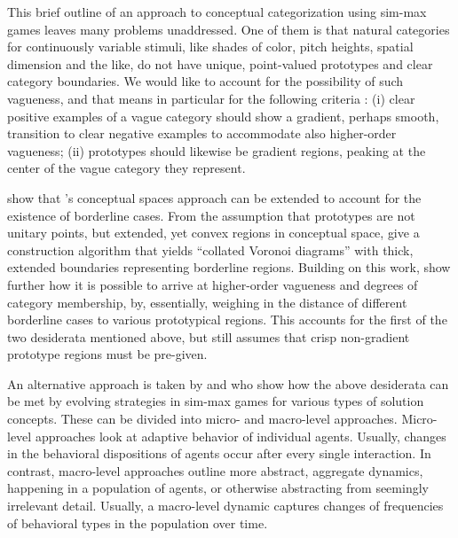 This brief outline of an approach to conceptual categorization using
sim-max games leaves many problems unaddressed. One of them is that
natural categories for continuously variable stimuli, like shades of
color, pitch heights, spatial dimension and the like, do not have
unique, point-valued prototypes and clear category boundaries. We
would like to account for the possibility of such vagueness, and that
means in particular for the following criteria
\citep[e.g.][]{Sainsbury1991:Is-There-Higher,KeefeSmith1997:Vagueness:-A-Re,Smith2008:Vagueness-and-D}:
(i) clear positive examples of a vague category should show a
gradient, perhaps smooth, transition to clear negative examples to
accommodate also higher-order vagueness; (ii) prototypes should
likewise be gradient regions, peaking at the center of the vague
category they represent.


\citet{DouvenDecock2011:Vagueness:-A-Co} show that
\citeauthor{Gardenfors2000:Conceptual-Spac}'s conceptual spaces
approach can be extended to account for the existence of borderline
cases. From the assumption that prototypes are not unitary points, but
extended, yet convex regions in conceptual space,
\citeauthor{DouvenDecock2011:Vagueness:-A-Co} give a construction
algorithm that yields ``collated Voronoi diagrams'' with thick,
extended boundaries representing borderline regions. Building on this
work, \citet{DecockDouven2012:What-is-Graded-} show further how it is
possible to arrive at higher-order vagueness and degrees of category
membership, by, essentially, weighing in the distance of different
borderline cases to various prototypical regions. This accounts for
the first of the two desiderata mentioned above, but still assumes
that crisp non-gradient prototype regions must be pre-given.

An alternative approach is taken by
\citet{FrankeJager2010:Vagueness-Signa} and
\citet{OConnor2013:The-Evolution-o} who show how the above desiderata
can be met by evolving strategies in sim-max games for various types
of solution concepts. These can be divided into micro- and macro-level
approaches. Micro-level approaches look at adaptive behavior of
individual agents. Usually, changes in the behavioral dispositions of
agents occur after every single interaction. In contrast, macro-level
approaches outline more abstract, aggregate dynamics, happening in a
population of agents, or otherwise abstracting from seemingly
irrelevant detail. Usually, a macro-level dynamic captures changes of
frequencies of behavioral types in the population over time.

